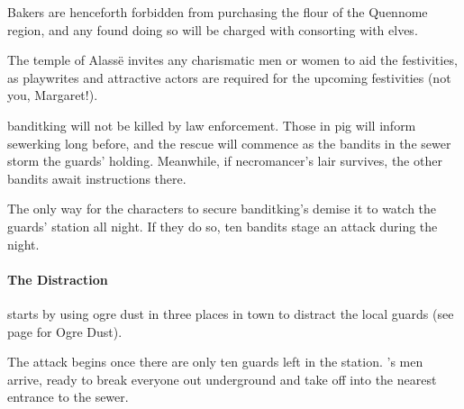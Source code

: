 \begin{multicols}{2}
\begin{boxtext}
  Bakers are henceforth forbidden from purchasing the flour of the Quennome region, and any found doing so will be charged with consorting with elves.

  The temple of Alass\"e invites any charismatic men or women to aid the festivities, as playwrites and attractive actors are required for the upcoming festivities (not you, Margaret!).

\end{boxtext}

\Gls{banditking} will not be killed by law enforcement.
Those in \gls{pig} will inform \gls{sewerking} long before, and the rescue will commence as the bandits in the sewer storm the guards' holding.
Meanwhile, if \gls{necromancer}'s lair survives, the other bandits await instructions there.


The only way for the characters to secure \gls{banditking}'s demise it to watch the guards' station all night.
If they do so, ten bandits stage an attack during the night.

\paragraph{The Distraction} starts by using ogre dust in three places in town to distract the local guards (see page \pageref{ogredust} for Ogre Dust).

The attack begins once there are only ten guards left in the station.
's men arrive, ready to break everyone out underground and take off into the nearest entrance to the sewer.

\stopcontents[sq]

\stopcontents[Villages]

\end{multicols}
